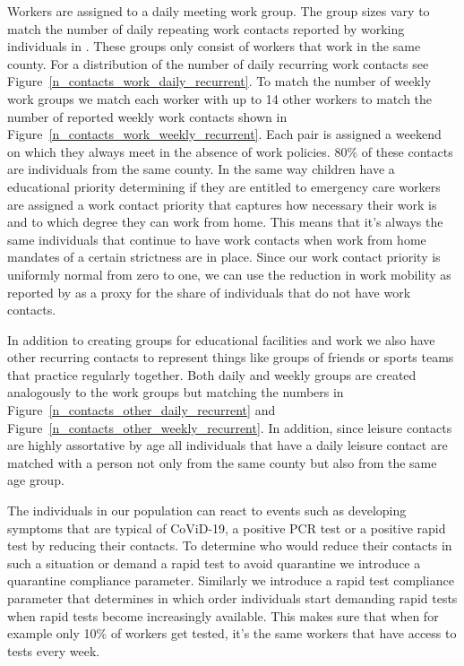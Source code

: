 Workers are assigned to a daily meeting work group. The group sizes vary to match the
number of daily repeating work contacts reported by working individuals in
\cite{Mossong2008}. These groups only consist of workers that work in the same county.
For a distribution of the number of daily recurring work contacts see
Figure~\ref{n_contacts_work_daily_recurrent}. To match the number of weekly work groups
we match each worker with up to 14 other workers to match the number of reported weekly
work contacts shown in Figure~\ref{n_contacts_work_weekly_recurrent}. Each pair is
assigned a weekend on which they always meet in the absence of work policies. 80\% of
these contacts are individuals from the same county.
In the same way children have a educational priority determining if they are entitled to
emergency care workers are assigned a work contact priority that captures how necessary
their work is and to which degree they can work from home. This means that it's always
the same individuals that continue to have work contacts when work from home mandates of
a certain strictness are in place. Since our work contact priority is uniformly normal
from zero to one, we can use the reduction in work mobility as reported by
\cite{Google2021} as a proxy for the share of individuals that do not have work contacts.

In addition to creating groups for educational facilities and work we also have other
recurring contacts to represent things like groups of friends or sports teams that
practice regularly together. Both daily and weekly groups are created analogously to the
work groups but matching the numbers in Figure~\ref{n_contacts_other_daily_recurrent} and
Figure~\ref{n_contacts_other_weekly_recurrent}. In addition, since leisure contacts are
highly assortative by age all individuals that have a daily leisure contact are matched
with a person not only from the same county but also from the same age group.

The individuals in our population can react to events such as developing symptoms that
are typical of CoViD-19, a positive PCR test or a positive rapid test by reducing their
contacts. To determine who would reduce their contacts in such a situation or demand a
rapid test to avoid quarantine we introduce a quarantine compliance parameter. Similarly
we introduce a rapid test compliance parameter that determines in which order individuals
start demanding rapid tests when rapid tests become increasingly available. This makes
sure that when for example only 10\% of workers get tested, it's the same workers that
have access to tests every week.

